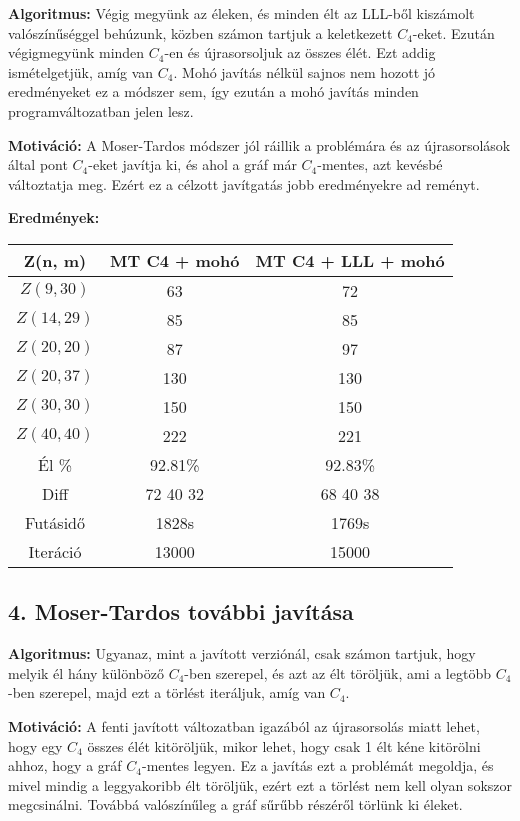 \documentclass[12pt,a4paper]{article}
\begin{document}
\textbf{Algoritmus:} Végig megyünk az éleken, és minden élt az LLL-ből kiszámolt valószínűséggel behúzunk, közben számon tartjuk a keletkezett $C_4$-eket. Ezután végigmegyünk minden $C_4$-en és újrasorsoljuk az összes élét. Ezt addig ismételgetjük, amíg van $C_4$. Mohó javítás nélkül sajnos nem hozott jó eredményeket ez a módszer sem, így ezután a mohó javítás minden programváltozatban jelen lesz.

\textbf{Motiváció:} A Moser-Tardos módszer jól ráillik a problémára és az újrasorsolások által pont $C_4$-eket javítja ki, és ahol a gráf már $C_4$-mentes, azt kevésbé változtatja meg. Ezért ez a célzott javítgatás jobb eredményekre ad reményt.

\textbf{Eredmények:}
\begin{table}[H]
\centering
\begin{tabular}{|c|c|c|}
\hline
\textbf{Z(n, m)} & \textbf{MT C4 + mohó} & \textbf{MT C4 + LLL + mohó} \\
\hline
$Z(9,30)$  & 63 & 72 \\
$Z(14, 29)$ & 85 & 85 \\
$Z(20, 20)$ & 87 & 97 \\
$Z(20, 37)$ & 130 & 130 \\
$Z(30, 30)$ & 150 & 150 \\
$Z(40, 40)$ & 222 & 221 \\
\hline
Él \% & 92.81\% & 92.83\% \\
\hline
Diff & 72 40 32 & 68 40 38 \\
\hline
Futásidő & 1828s & 1769s \\
Iteráció & 13000 & 15000 \\
\hline
\end{tabular}
\end{table}
\subsection*{4. Moser-Tardos további javítása}

\textbf{Algoritmus:} Ugyanaz, mint a javított verziónál, csak számon tartjuk, hogy melyik él hány különböző $C_4$-ben szerepel, és azt az élt töröljük, ami a legtöbb $C_4$-ben szerepel, majd ezt a törlést iteráljuk, amíg van $C_4$.

\textbf{Motiváció:} A fenti javított változatban igazából az újrasorsolás miatt lehet, hogy egy $C_4$ összes élét kitöröljük, mikor lehet, hogy csak 1 élt kéne kitörölni ahhoz, hogy a gráf $C_4$-mentes legyen. Ez a javítás ezt a problémát megoldja, és mivel mindig a leggyakoribb élt töröljük, ezért ezt a törlést nem kell olyan sokszor megcsinálni. Továbbá valószínűleg a gráf sűrűbb részéről törlünk ki éleket.
\end{document}
